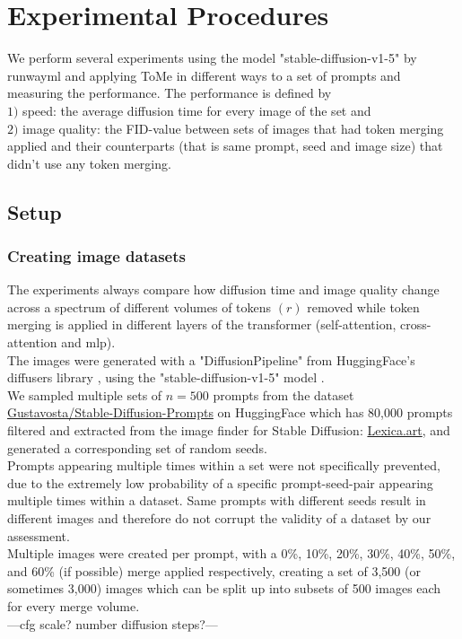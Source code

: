 \section{Experimental Procedures}
We perform several experiments using the model "stable-diffusion-v1-5" by runwayml \cite{Rombach_2022_CVPR} and applying ToMe in different ways to a set of prompts and measuring the performance.
The performance is defined by\\ 
\(1)\) speed: the average diffusion time for every image of the set and\\
\(2)\) image quality: the FID-value between sets of images that had token merging applied and their counterparts (that is same prompt, seed and image size) that didn't use any token merging.



\subsection{Setup}
\subsubsection*{Creating image datasets}
The experiments always compare how diffusion time and image quality change across a spectrum of different volumes of tokens \((r)\) removed while token merging is applied in different layers of the transformer (self-attention, cross-attention and mlp).\\
The images were generated with a "DiffusionPipeline" from HuggingFace's diffusers library \cite{von-platen-etal-2022-diffusers}, using the "stable-diffusion-v1-5" model \cite{Rombach_2022_CVPR}.\\
We sampled multiple sets of \(n=500\) prompts from the dataset \href{https://huggingface.co/datasets/Gustavosta/Stable-Diffusion-Prompts}{Gustavosta/Stable-Diffusion-Prompts} on HuggingFace which has 80,000 prompts filtered and extracted from the image finder for Stable Diffusion: \href{https://lexica.art}{Lexica.art}, and generated a corresponding set of random seeds.\\ 
Prompts appearing multiple times within a set were not specifically prevented, due to the extremely low probability of a specific prompt-seed-pair appearing multiple times within a dataset. Same prompts with different seeds result in different images and therefore do not corrupt the validity of a dataset by our assessment.\\
Multiple images were created per prompt, with a 0\%, 10\%, 20\%, 30\%, 40\%, 50\%, and 60\% (if possible) merge applied respectively, creating a set of 3,500 (or sometimes 3,000) images which can be split up into subsets of 500 images each for every merge volume.\\
---cfg scale? number diffusion steps?---



